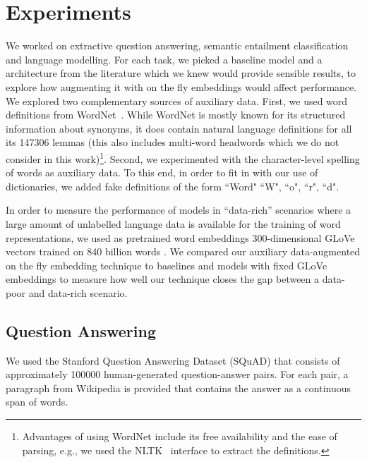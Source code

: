 \section{Experiments}
\label{sec:experiments}

We worked on extractive question answering, semantic entailment classification and language modelling. For each task, we picked a baseline model and a architecture from the literature which we knew would provide sensible results, to explore how augmenting it with on the fly embeddings would affect performance. We explored two complementary sources of auxiliary data. First, we used word definitions from WordNet~\citep{miller95wordnet}. While WordNet is mostly known for its structured information about synonyms, it does contain natural language definitions for all its 147306 lemmas (this also includes multi-word headwords which we do not consider in this work)\footnote{Advantages of using WordNet include its free availability and the ease of parsing, e.g., we used the NLTK~\citep{bird2006nltk} interface to extract the definitions.}. Second, we experimented with the character-level spelling of words as auxiliary data. To this end, in order to fit in with our use of dictionaries, we added fake definitions of the form ``Word"  ``W", ``o", ``r", ``d".

In order to measure the performance of models in ``data-rich'' scenarios where a large amount of unlabelled language data is available for the training of word representations, we used as pretrained word embeddings 300-dimensional GLoVe vectors trained on 840 billion words \citep{pennington2014glove}. We compared our auxiliary data-augmented on the fly embedding technique to baselines and models with fixed GLoVe embeddings to measure how well our technique closes the gap between a data-poor and data-rich scenario.

\subsection{Question Answering}
\label{sec:qa}
We used the Stanford Question Answering Dataset (SQuAD) \citep{rajpurkar2016squad} that consists of approximately 100000 human-generated question-answer pairs. For each pair, a paragraph from Wikipedia is provided that contains the answer as a continuous span of words.

